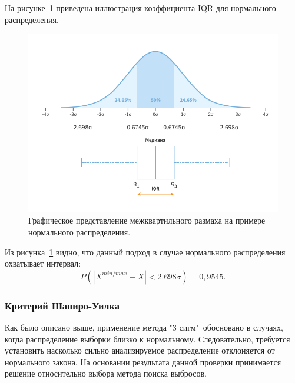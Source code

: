 На рисунке~\ref{fig:ris6} приведена иллюстрация коэффициента IQR для нормального распределения.

\begin{figure}[H]
	\centering
	\includegraphics[width=1\linewidth]{pics/ris6} %
	\caption{Графическое представление межквартильного размаха на примере нормального распределения.}
	\label{fig:ris6} %
\end{figure}

Из рисунка~\ref{fig:ris6} видно, что данный подход в случае нормального распределения охватывает интервал:
\begin{equation} \label{eq:IQRP}
	P(|X^{min/max} - X| < 2.698\sigma)  = 0,9545.
\end{equation}



\subsubsection{Критерий Шапиро-Уилка}
Как было описано выше, применение метода "3 сигм"\ обосновано в случаях, когда распределение выборки близко к нормальному. Следовательно, требуется установить насколько сильно анализируемое распределение отклоняется от нормального закона.
На основании результата данной проверки принимается решение относительно выбора метода поиска выбросов. 


